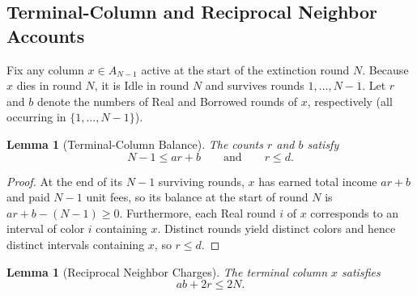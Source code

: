 \documentclass[11pt,a4paper]{article}
\newtheorem{lemma}[theorem]{Lemma}
\theoremstyle{remark}
\begin{document}
\subsection{Terminal-Column and Reciprocal Neighbor Accounts}

Fix any column $x \in A_{N-1}$ active at the start of the extinction round $N$. Because $x$ dies in round $N$, it is Idle in round $N$ and survives rounds $1, \dots, N-1$. Let $r$ and $b$ denote the numbers of Real and Borrowed rounds of $x$, respectively (all occurring in $\{1, \dots, N-1\}$).

\begin{lemma}[Terminal-Column Balance]\label{lem:own}
The counts $r$ and $b$ satisfy
\begin{equation}\label{eq:own}
  N - 1 \le ar + b \qquad\text{and}\qquad r \le d.
\end{equation}
\end{lemma}

\begin{proof}
At the end of its $N - 1$ surviving rounds, $x$ has earned total income $ar + b$ and paid $N - 1$ unit fees, so its balance at the start of round $N$ is $ar + b - (N - 1) \ge 0$. Furthermore, each Real round $i$ of $x$ corresponds to an interval of color $i$ containing $x$. Distinct rounds yield distinct colors and hence distinct intervals containing $x$, so $r \le d$.
\end{proof}

\begin{lemma}[Reciprocal Neighbor Charges]\label{lem:recip}
The terminal column $x$ satisfies
\begin{equation}\label{eq:recip}
  ab + 2r \le 2N.
\end{equation}
\end{lemma}
\end{document}
